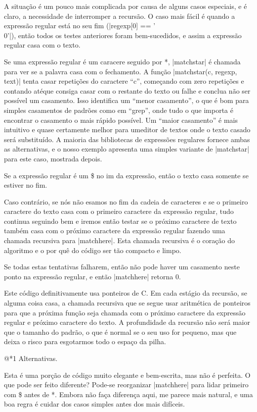 A situação é um pouco mais complicada por causa de alguns casos
especiais, e é claro, a necessidade de interromper a recursão. O caso
mais fácil é quando a expressão regular está no seu fim (|regexp[0] ==
'\\ 0'|), então todos os testes anteriores foram bem-sucedidos, e
assim a expressão regular casa com o texto.

Se uma expressão regular é um caracere seguido por *, |matchstar| é
chamada para ver se a palavra casa com o fechamento. A
função |matchstar(c, regexp, text)| tenta casar repetições
do caractere ``c'', começando com zero repetições e contando atéque
consiga casar com o restante do texto ou falhe e conclua não ser
possível um casamento. Isso identifica um ``menor casamento'', o que é
bom para simples casamentos de padrões como em ``grep'', onde tudo o
que importa é encontrar o casamento o mais rápido possível. Um ``maior
casamento'' é mais intuitivo e quase certamente melhor para umeditor
de textos onde o texto casado será substituído. A maioria das
bibliotecas de expressões regulares fornece ambas as alternativas, e o
nosso exemplo apresenta uma simples variante de |matchstar|
para este caso, mostrada depois.

Se a expressão regular é um \$ no im da expressão, então o texto casa
somente se estiver no fim.

Caso contrário, se nós não esamos no fim da cadeia de caracteres e se
o primeiro caractere do texto casa com o primeiro caractere da
expressão regular, tudo continua seguindo bem e iremos então testar se
o próximo caractere de texto também casa com o próximo caractere da
expressão regular fazendo uma chamada recursiva para |matchhere|. Esta
chamada recursiva é o coração do algoritmo e o por quê do código ser
tão compacto e limpo.

Se todas estas tentativas falharem, então não pode haver um casamento
neste ponto na expressão regular, e então |matchhere| retorna 0.

Este código definitivamente usa ponteiros de C. Em cada estágio da
recursão, se alguma coisa casa, a chamada recursiva que se segue usar
aritmética de ponteiros para que a próxima função seja chamada com o
próximo caractere da expressão regular e próximo caractere do texto. A
profundidade da recursão não será maior que o tamanho do padrão, o que
é normal se o seu uso for pequeno, mas que deixa o risco para
esgotarmos todo o espaço da pilha.

@*1 Alternativas.

Esta é uma porção de código muito elegante e bem-escrita, mas não é
perfeita. O que pode ser feito diferente? Pode-se reorganizar
|matchhere| para lidar primeiro com \$ antes de *. Embora não faça
diferença aqui, me parece mais natural, e uma boa regra é cuidar dos
casos simples antes dos mais difíceis.

